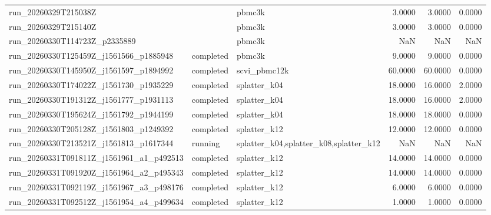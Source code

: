 \begin{tabular}{lllrrr}
run\_20260329T215038Z &  & pbmc3k & 3.0000 & 3.0000 & 0.0000 \\
run\_20260329T215140Z &  & pbmc3k & 3.0000 & 3.0000 & 0.0000 \\
run\_20260330T114723Z\_p2335889 &  & pbmc3k & NaN & NaN & NaN \\
run\_20260330T125459Z\_j1561566\_p1885948 & completed & pbmc3k & 9.0000 & 9.0000 & 0.0000 \\
run\_20260330T145950Z\_j1561597\_p1894992 & completed & scvi\_pbmc12k & 60.0000 & 60.0000 & 0.0000 \\
run\_20260330T174022Z\_j1561730\_p1935229 & completed & splatter\_k04 & 18.0000 & 16.0000 & 2.0000 \\
run\_20260330T191312Z\_j1561777\_p1931113 & completed & splatter\_k04 & 18.0000 & 16.0000 & 2.0000 \\
run\_20260330T195624Z\_j1561792\_p1944199 & completed & splatter\_k04 & 18.0000 & 18.0000 & 0.0000 \\
run\_20260330T205128Z\_j1561803\_p1249392 & completed & splatter\_k12 & 12.0000 & 12.0000 & 0.0000 \\
run\_20260330T213521Z\_j1561813\_p1617344 & running & splatter\_k04,splatter\_k08,splatter\_k12 & NaN & NaN & NaN \\
run\_20260331T091811Z\_j1561961\_a1\_p492513 & completed & splatter\_k12 & 14.0000 & 14.0000 & 0.0000 \\
run\_20260331T091920Z\_j1561964\_a2\_p495343 & completed & splatter\_k12 & 14.0000 & 14.0000 & 0.0000 \\
run\_20260331T092119Z\_j1561967\_a3\_p498176 & completed & splatter\_k12 & 6.0000 & 6.0000 & 0.0000 \\
run\_20260331T092512Z\_j1561954\_a4\_p499634 & completed & splatter\_k12 & 1.0000 & 1.0000 & 0.0000 \\
\bottomrule
\end{tabular}
